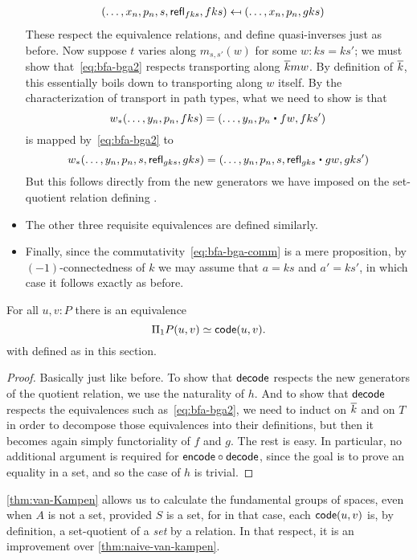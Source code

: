 \begin{itemize}
\begin{align*}
    (\dots, x_n, p_n, s, \mathsf{refl}_{fks}, fks) &\mapsfrom (\dots, x_n, p_n, gks)
  \end{align*}
  These respect the equivalence relations, and define quasi-inverses just as before.
  Now suppose $t$ varies along $m_{s,s'}(w)$ for some $w:ks=ks'$; we must show that~\eqref{eq:bfa-bga2} respects transporting along $\overline{k} mw$.
  By definition of $\overline{k}$, this essentially boils down to transporting along $w$ itself.
  By the characterization of transport in path types, what we need to show is that
  \[ w_*(\dots, y_n, p_n,fks) = (\dots,y_n, p_n \ct fw, fks') \]
  is mapped by~\eqref{eq:bfa-bga2} to
  \[ w_*(\dots,y_n,p_n,s,\refl{gks},gks) = (\dots, y_n, p_n, s, \refl{gks} \ct gw, gks') \]
  But this follows directly from the new generators we have imposed on the set-quotient relation defining \code.
\item The other three requisite equivalences are defined similarly.
\item Finally, since the commutativity~\eqref{eq:bfa-bga-comm} is a mere proposition, by $(-1)$-connectedness of $k$ we may assume that $a=ks$ and $a'=ks'$, in which case it follows exactly as before.
\end{itemize}

\begin{thm}\label{thm:van-Kampen}
  For all $u,v:P$ there is an equivalence
  \[ \Pi_1P(u,v) \simeq \mathsf{code}(u,v). \]
  with \code defined as in this section.
\end{thm}

\begin{proof}
  Basically just like before.
  To show that $\mathsf{decode}$ respects the new generators of the quotient relation, we use the naturality of $h$.
  And to show that $\mathsf{decode}$ respects the equivalences such as~\eqref{eq:bfa-bga2}, we need to induct on $\overline{k}$ and on $T$ in order to decompose those equivalences into their definitions, but then it becomes again simply functoriality of $f$ and $g$.
  The rest is easy.
  In particular, no additional argument is required for $\mathsf{encode}\circ\mathsf{decode}$, since the goal is to prove an equality in a set, and so the case of $h$ is trivial.
\end{proof}

\autoref{thm:van-Kampen} allows us to calculate the fundamental groups of
spaces, even when $A$ is not a set, provided $S$ is a set, for in that case,
each $\mathsf{code}(u,v)$ is, by definition, a set-quotient of a {\em set} by a
relation.  In that respect, it is an improvement over
\autoref{thm:naive-van-kampen}.

